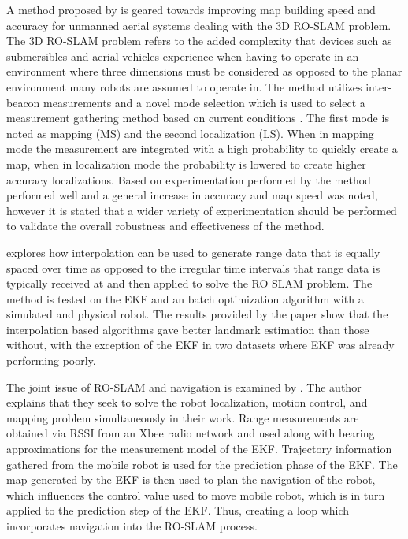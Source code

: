 \documentclass[conference]{IEEEtran}
\begin{document}
	
	
	A method proposed by \cite{Dios2015} is geared towards improving map building speed and accuracy for unmanned aerial systems dealing with the 3D RO-SLAM problem. The 3D RO-SLAM problem refers to the added complexity that devices such as submersibles \cite{Newman} and aerial vehicles experience when having to operate in an environment where three dimensions must be considered as opposed to the planar environment many robots are assumed to operate in. The method utilizes inter-beacon measurements and a novel mode selection which is used to select a measurement gathering method based on current conditions \cite{Dios2015}. The first mode is noted as mapping (MS) and the second localization (LS). When in mapping mode the measurement are integrated with a high probability to quickly create a map, when in localization mode the probability is lowered to create higher accuracy localizations. Based on experimentation performed by \cite{Dios2015} the method performed well and a general increase in accuracy and map speed was noted, however it is stated that a wider variety of experimentation should be performed to validate the overall robustness and effectiveness of the method.
	
	
	
	
	\cite{Kehagias2006} explores how interpolation can be used to generate range data that is equally spaced over time as opposed to the irregular time intervals that range data is typically received at and then applied to solve the RO SLAM problem. The method is tested on the EKF and an batch optimization algorithm with a simulated and physical robot. The results provided by the paper show that the interpolation based algorithms gave better landmark estimation than those without, with the exception of the EKF in two datasets where EKF was already performing poorly.
	
	
	The joint issue of RO-SLAM and navigation is examined by \cite{Miah2018}. The author explains that they seek to solve the robot localization, motion control, and mapping problem simultaneously in their work. Range measurements are obtained via RSSI from an Xbee radio network and used along with bearing approximations for the measurement model of the EKF. Trajectory information gathered from the mobile robot is used for the prediction phase of the EKF. The map generated by the EKF is then used to plan the navigation of the robot, which influences the control value used to move mobile robot, which is in turn applied to the prediction step of the EKF. Thus, creating a loop which incorporates navigation into the RO-SLAM process.  
	
\end{document}
